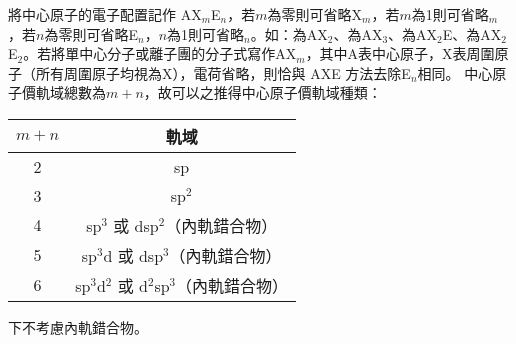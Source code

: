 \documentclass[a4paper,12pt]{report}
\begin{document}
將中心原子的電子配置記作 AX$_m$E$_n$，若$m$為零則可省略X$_m$，若$m$為1則可省略$_m$，若$n$為零則可省略E$_n$，$n$為1則可省略$_n$。如：為AX$_2$、為AX$_3$、為AX$_2$E、為AX$_2$E$_2$。若將單中心分子或離子團的分子式寫作AX$_m$，其中A表中心原子，X表周圍原子（所有周圍原子均視為X），電荷省略，則恰與 AXE 方法去除E$_n$相同。
中心原子價軌域總數為$m+n$，故可以之推得中心原子價軌域種類：
\begin{longtable}[c]{|c|c|}
\hline
$m+n$ & 軌域\\\hline
\endhead
2 & sp \\\hline
3 & sp$^2$ \\\hline
4 & sp$^3$ 或 dsp$^2$（內軌錯合物） \\\hline
5 & sp$^3$d 或 dsp$^3$（內軌錯合物） \\\hline
6 & sp$^3$d$^2$ 或 d$^2$sp$^3$（內軌錯合物） \\\hline
\end{longtable}\FB
{}
下不考慮內軌錯合物。
\end{document}
